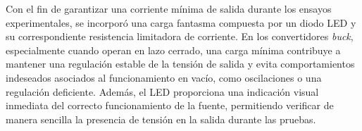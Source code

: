 Con el fin de garantizar una corriente mínima de salida durante los ensayos experimentales, se incorporó una carga fantasma compuesta por un diodo LED y su correspondiente resistencia limitadora de corriente. En los convertidores \textit{buck}, especialmente cuando operan en lazo cerrado, una carga mínima contribuye a mantener una regulación estable de la tensión de salida y evita comportamientos indeseados asociados al funcionamiento en vacío, como oscilaciones o una regulación deficiente. Además, el LED proporciona una indicación visual inmediata del correcto funcionamiento de la fuente, permitiendo verificar de manera sencilla la presencia de tensión en la salida durante las pruebas.
